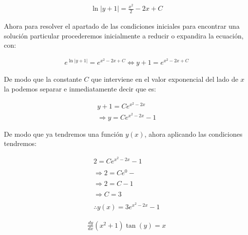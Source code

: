\begin{equation*}
    \begin{gathered}
        \ln\left|y+1\right|=\frac{x^{2}}{2}-2x+C
    \end{gathered}
\end{equation*}

Ahora para resolver el apartado de las condiciones iniciales para encontrar una solución particular procederemos inicialmente a reducir o expandira la ecuación, con:

\begin{equation*}
    \begin{gathered}
        e^{\ln|y+1|}=e^{x^{2}-2x+C} \Leftrightarrow y+1=e^{x^{2}-2x+C}
    \end{gathered}
\end{equation*}

De modo que la constante \(\displaystyle C\) que interviene en el valor exponencial del lado de \(\displaystyle x\) la podemos separar e inmediatamente decir que es:

\begin{equation*}
    \begin{gathered}
        y+1=Ce^{x^{2}-2x}\\
        \Rightarrow y=Ce^{x^{2}-2x}-1
    \end{gathered}
\end{equation*}

De modo que ya tendremos una función \(\displaystyle y(x)\), ahora aplicando las condiciones tendremos:

\begin{equation*}
    \begin{gathered}
        2=Ce^{x^{2}-2x}-1\\\\
        \Rightarrow 2=Ce^{0}-\\\\
        \Rightarrow 2=C-1\\\\
        \Rightarrow C=3\\\\
        \therefore y(x)=3e^{x^{2}-2x}-1
    \end{gathered}
\end{equation*}

\clearpage
\begin{equation}
    \begin{gathered}
        \frac{dy}{dx}(x^{2}+1)\tan(y)=x
    \end{gathered}
\end{equation}

